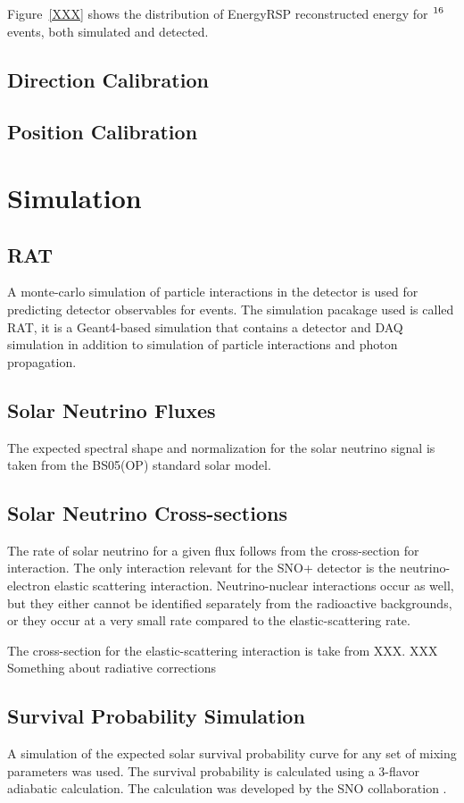 Figure~\ref{XXX} shows the  distribution of EnergyRSP reconstructed energy for
$\ce{^{16}}$ events, both simulated and detected.
\subsection{Direction Calibration}
\subsection{Position Calibration}
\section{Simulation}
\subsection{RAT}
A monte-carlo simulation of particle interactions in the detector is used
for predicting detector observables for events.
The simulation pacakage used is called RAT, it is a Geant4-based simulation that
contains a detector and DAQ simulation in addition to simulation of particle
interactions and photon propagation.

\subsection{Solar Neutrino Fluxes}
The expected spectral shape and normalization for the solar neutrino signal is
taken from the BS05(OP) standard solar model.

\subsection{Solar Neutrino Cross-sections}
The rate of solar neutrino for a given flux follows from the cross-section for
interaction. The only interaction relevant for the SNO+ detector is the
neutrino-electron elastic scattering interaction.
Neutrino-nuclear interactions occur as well, but they either cannot be identified
separately from the radioactive backgrounds, or they occur at a very small rate
compared to the elastic-scattering rate.

The cross-section for the elastic-scattering interaction is take from
XXX.
XXX Something about radiative corrections

\subsection{Survival Probability Simulation}
A simulation of the expected solar survival probability curve for any set of mixing
parameters was used. The survival probability is calculated using a
3-flavor adiabatic calculation. The calculation was developed by the
SNO collaboration \cite{XXX}.

